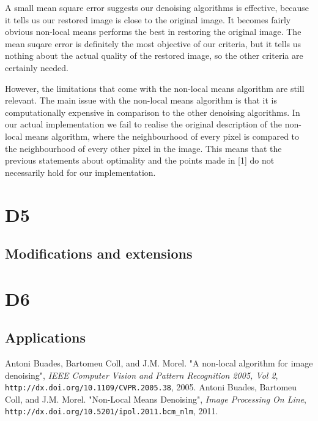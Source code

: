 \documentclass[fullpage]{article}
\begin{document}
A small mean square error suggests our denoising algorithms is effective, because it tells us our restored image is close to the original image. It becomes fairly obvious non-local means performs the best in restoring the original image. The mean suqare error is definitely the most objective of our criteria, but it tells us nothing about the actual quality of the restored image, so the other criteria are certainly needed.

However, the limitations that come with the non-local means algorithm are still relevant. The main issue with the non-local means algorithm is that it is computationally expensive in comparison to the other denoising algorithms. In our actual implementation we fail to realise the original description of the non-local means algorithm, where the neighbourhood of every pixel is compared to the neighbourhood of every other pixel in the image. This means that the previous statements about optimality and the points made in [1] do not necessarily hold for our implementation.
\section{D5}
\subsection{Modifications and extensions}
\section{D6}
\subsection{Applications}
\begin{thebibliography}{9}
Antoni Buades, Bartomeu Coll, and J.M. Morel.
"A non-local algorithm for image denoising",
\textit{IEEE Computer Vision and Pattern Recognition 2005, Vol 2}, \texttt{http://dx.doi.org/10.1109/CVPR.2005.38}, 2005.
Antoni Buades, Bartomeu Coll, and J.M. Morel.
"Non-Local Means Denoising",
\textit{Image Processing On Line}, \texttt{http://dx.doi.org/10.5201/ipol.2011.bcm\_nlm}, 2011.
\end{thebibliography}
\end{document}
